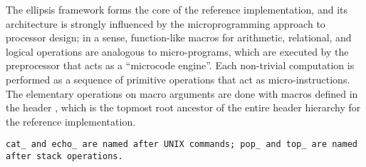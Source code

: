 The ellipsis framework forms the core of the reference implementation,
and its architecture is strongly influenced by the microprogramming
approach to processor design; in a sense, function-like macros for
arithmetic, relational, and logical operations are analogous to micro-programs,
which are executed by the preprocessor that acts as a ``microcode engine''.
Each non-trivial computation is performed as a sequence
of primitive operations that act as micro-instructions.
The elementary operations on macro arguments are done with macros
defined in the header , which is the topmost root
ancestor of the entire header hierarchy for the reference implementation.

\note \tt{cat_} and \tt{echo_} are named after UNIX commands;
\tt{pop_} and \tt{top_} are named after stack operations.

\subsection{}


\subsection{}


\subsection{}


\subsection{}


\subsection{}


\subsection{}

